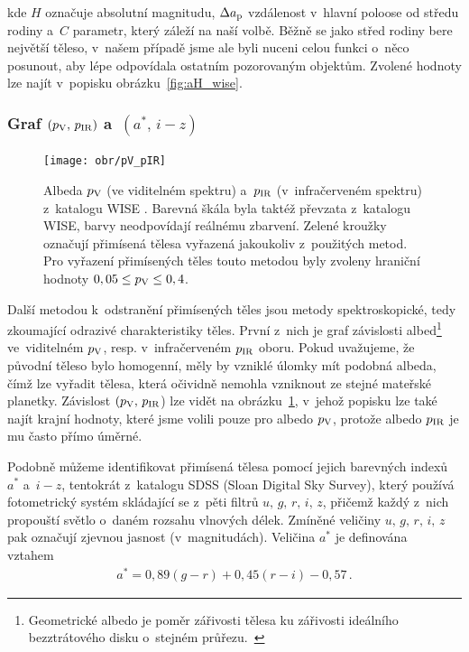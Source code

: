 \documentclass[A4paper, 12pt, oneside, openany]{book}
\begin{document}
kde $H$ označuje absolutní magnitudu, $\Delta a_{\rm p}$ vzdálenost v~hlavní poloose od středu rodiny a~$C$ parametr, který záleží na naší volbě. Běžně se jako střed rodiny bere největší těleso, v~našem případě jsme ale byli nuceni celou funkci o~něco posunout, aby lépe odpovídala ostatním pozorovaným objektům. Zvolené hodnoty lze najít v~popisku obrázku~\ref{fig:aH_wise}.

\subsubsection{Graf $(p_{\rm V},\,p_{\rm IR})$ a~$(a^*,\,i-z)$}

\begin{figure}
	\centering
	\texttt{[image: obr/pV\_pIR]}
	\caption{Albeda $p_{\rm V}$ (ve viditelném spektru) a~$p_{\rm IR}$ (v~infračerveném spektru) z~katalogu WISE \cite{nugent15}. Barevná škála byla taktéž převzata z~katalogu WISE, barvy neodpovídají reálnému zbarvení. Zelené kroužky označují přimísená tělesa vyřazená jakoukoliv z~použitých metod. Pro vyřazení přimísených těles touto metodou byly zvoleny hraniční hodnoty $0,05 \leq p_{\rm V} \leq 0,4$.}
	\label{fig:pV_pIR}
\end{figure}

Další metodou k~odstranění přimísených těles jsou metody spektroskopické, tedy zkoumající odrazivé charakteristiky těles. První z~nich je graf závislosti albed\footnote{Geometrické albedo je poměr zářivosti tělesa ku zářivosti ideálního bezztrátového disku o~stejném průřezu.~\cite{fmt}} ve~viditelném $p_{\rm V}$, resp. v~infračerveném $p_{\rm IR}$ oboru. Pokud uvažujeme, že původní těleso bylo homogenní, měly by vzniklé úlomky mít podobná albeda, čímž lze vyřadit tělesa, která očividně nemohla vzniknout ze stejné mateřské planetky. Závislost $(p_{\rm V},\,p_{\rm IR}$) lze vidět na obrázku~\ref{fig:pV_pIR}, v~jehož popisku lze také najít krajní hodnoty, které jsme volili pouze pro albedo $p_{\rm V}$, protože albedo $p_{\rm IR}$ je mu často přímo úměrné.


Podobně můžeme identifikovat přimísená tělesa pomocí jejich barevných indexů $a^*$ a~$i-z$, tentokrát z~katalogu SDSS (Sloan Digital Sky Survey), který používá fotometrický systém skládající se z~pěti filtrů $u,\,g,\,r,\,i,\,z$, přičemž každý z~nich propouští světlo o~daném rozsahu vlnových délek. Zmíněné veličiny $u,\,g,\,r,\,i,\,z$ pak označují zjevnou jasnost (v~magnitudách). Veličina $a^*$ je definována vztahem~\cite{ivezic01}
\begin{align}
	a^ *= 0,89 (g - r) + 0,45 (r - i) - 0,57\,.
\end{align}
\end{document}
